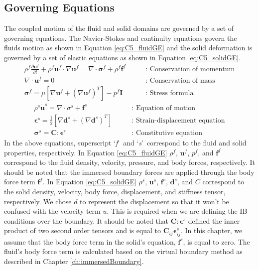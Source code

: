 \subsection{Governing Equations}
The coupled motion of the fluid and solid domains are governed by a set of governing equations. The Navier-Stokes and continuity equations govern the fluids motion as shown in Equation \eqref{eq:C5_fluidGE} and the solid deformation is governed by a set of elastic equations as shown in Equation \eqref{eq:C5_solidGE}.
%
\begin{subequations}\label{eq:C5_fluidGE}
\begin{align}
	\rho^f \frac{\partial \mathbf{u}^f}{\partial t} + 
	\rho^f \mathbf{u}^f \cdot \nabla \mathbf{u}^f = 
	\nabla \cdot \mathbf{\sigma}^f +
	\rho^f \mathbf{f}^f
	\quad \quad &\text{: Conservation of momentum}
	\\
	\nabla \cdot \mathbf{u}^f = 0
	\quad \quad &\text{: Conservation of mass}
	\\
	\mathbf{\sigma}^f = 
	\mu \left[ \nabla \mathbf{u}^f + \left( \nabla \mathbf{u}^f \right)^T \right] - 
	p^f \mathbf{I}
	\quad \quad &\text{: Stress formula}
\end{align}
\end{subequations}
%
\begin{subequations}\label{eq:C5_solidGE}
\begin{align}
	\rho^s \dot{\mathbf{u}}^s = 
	\nabla \cdot \sigma^s + \mathbf{f}^s
	\quad \quad &\text{: Equation of motion}
	\\
	\mathbf{\epsilon^s} = \frac{1}{2}
	                                 \left[ \nabla \mathbf{d}^s + \left( \nabla \mathbf{d}^s \right)^T \right]
	\quad \quad &\text{: Strain-displacement equation}
	\\
	\mathbf{\sigma}^s = \mathbf{C} : \mathbf{\epsilon}^s
	\quad \quad &\text{: Constitutive equation}
\end{align}
\end{subequations}
%
In the above equations, superscript \lq\emph{f}\rq\ and \lq\emph{s}\rq\ correspond to the fluid and solid properties, respectively. In Equation \eqref{eq:C5_fluidGE} $\rho^f$, $\mathbf{u}^f$, $p^f$, and $\mathbf{f}^f$ correspond to the fluid density, velocity, pressure, and body forces, respectively. It should be noted that the immersed boundary forces are applied through the body force term $\mathbf{f}^f$. In Equation \eqref{eq:C5_solidGE} $\rho^s$, $\mathbf{u}^s$, $\mathbf{f}^s$, $\mathbf{d}^s$, and $C$ correspond to the solid density, velocity, body force, displacement, and stiffness tensor, respectively. We chose $d$ to represent the displacement so that it won't be confused with the velocity term $u$. This is required when we are defining the IB conditions over the boundary. It should be noted that $\mathbf{C} : \mathbf{\epsilon}^s$ defined the inner product of two second order tensors and is equal to $\mathbf{C}_{ij} \mathbf{\epsilon}_{ij}^s$. In this chapter, we assume that the body force term in the solid's equation, $\mathbf{f}^s$, is equal to zero. The fluid's body force term is calculated based on the virtual boundary method as described in Chapter \ref{ch:immersedBoundary}.

